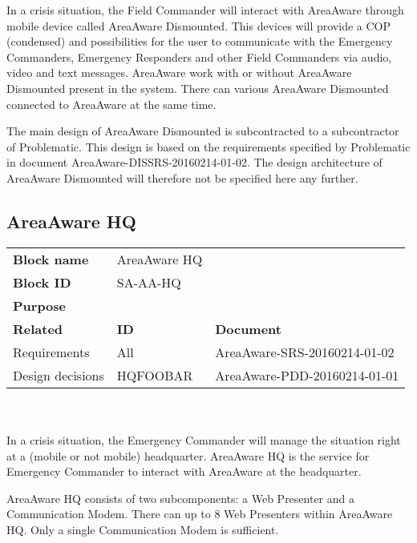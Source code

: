 \noindent In a crisis situation, the Field Commander will interact with AreaAware through mobile device called AreaAware Dismounted.
This devices will provide a COP (condensed) and possibilities for the user to communicate with the Emergency Commanders, Emergency Responders and other Field Commanders via audio, video and text messages.
AreaAware work with or without AreaAware Dismounted present in the system.
There can various AreaAware Dismounted connected to AreaAware at the same time.

The main design of AreaAware Dismounted is subcontracted to a subcontractor of Problematic.
This design is based on the requirements specified by Problematic in document  AreaAware-DISSRS-20160214-01-02.
The design architecture of AreaAware Dismounted will therefore not be specified here any further.

\subsection{AreaAware HQ}
\begin{tabular}{l|*{2}{l}}
    \textbf{Block name}     & AreaAware HQ \\
    \textbf{Block ID}       & SA-AA-HQ  \\
    \textbf{Purpose}        &  \\
    \hline
    \textbf{Related}    & \textbf{ID} & \textbf{Document} \\
    Requirements & All & AreaAware-SRS-20160214-01-02 \\
    Design decisions & HQFOOBAR & AreaAware-PDD-20160214-01-01 \\
\end{tabular}\\\\

\noindent In a crisis situation, the Emergency Commander will manage the situation right at a (mobile or not mobile) headquarter.
AreaAware HQ is the service for Emergency Commander to interact with AreaAware at the headquarter.




AreaAware HQ consists of two subcomponents: a Web Presenter and a Communication Modem.
There can up to 8 Web Presenters within AreaAware HQ.
Only a single Communication Modem is sufficient.



